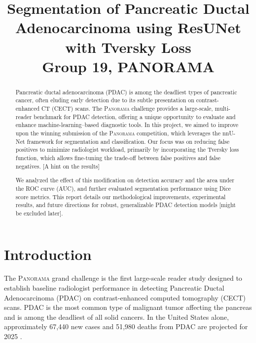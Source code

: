 \documentclass[conference]{IEEEtran}
\begin{document}
\title{Segmentation of Pancreatic Ductal Adenocarcinoma using ResUNet with Tversky Loss \\ {\Large Group 19, PANORAMA}}

\author{
\and
{}
\and
{}
\and
{}
}

\maketitle

\begin{abstract}
Pancreatic ductal adenocarcinoma (PDAC) is among the deadliest types of pancreatic cancer, often eluding early detection due to its subtle presentation on contrast-enhanced CT (CECT) scans. The \textsc{Panorama} challenge provides a large-scale, multi-reader benchmark for PDAC detection, offering a unique opportunity to evaluate and enhance machine-learning–based diagnostic tools. In this project, we aimed to improve upon the winning submission of the \textsc{Panorama} competition, which leverages the nnU-Net framework for segmentation and classification. Our focus was on reducing false positives to minimize radiologist workload, primarily by incorporating the Tversky loss function, which allows fine-tuning the trade-off between false positives and false negatives. [A hint on the results]


We analyzed the effect of this modification on detection accuracy and the area under the ROC curve (AUC), and further evaluated segmentation performance using Dice score metrics. This report details our methodological improvements, experimental results, and future directions for robust, generalizable PDAC detection models [might be excluded later].

\end{abstract}

\section{Introduction}
The \textsc{Panorama} grand challenge \cite{b5} is the first large-scale reader study designed to establish baseline radiologist performance in detecting Pancreatic Ductal Adenocarcinoma (PDAC) on contrast-enhanced computed tomography (CECT) scans. PDAC is the most common type of malignant tumor affecting the pancreas and is among the deadliest of all solid cancers. In the United States alone, approximately 67,440 new cases and 51,980 deaths from PDAC are projected for 2025 \cite{b2}.
\end{document}
